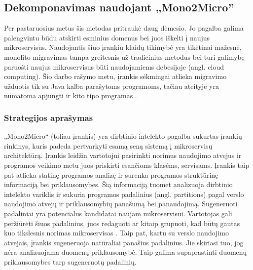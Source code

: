 \documentclass{VUMIFPSbakalaurinis}
\begin{document}

\subsection{Dekomponavimas naudojant „Mono2Micro”}
Per pastaruosius metus šis metodas pritraukė daug dėmesio. Jo pagalba galima palengvintu būdu atskirti esminius domenus bei juos iškelti į naujus mikroservisus. Naudojantis šiuo įrankiu klaidų tikimybė yra tikėtinai mažesnė, monolito migravimas tampa greitesnis už tradicinius metodus bei turi galimybę paruošti naujus mikroservisus būti naudojamiems debesijoje (angl. cloud computing). Šio darbo rašymo metu, įrankis sėkmingai atlieka migravimo užduotis tik su Java kalba parašytoms programoms, tačiau ateityje yra numatoma apjungti ir kito tipo programas \cite{KXL+20}.

\subsubsection{Strategijos aprašymas}
„Mono2Micro“ (toliau įrankis) yra dirbtinio intelekto pagalba sukurtas įrankių rinkinys, kuris padeda pertvarkyti esamą seną sistemą į mikroservisų architektūrą. Įrankis leidžia vartotojui pasirinkti norimus naudojimo atvejus ir programos veikimo metu juos priskirti esančioms klasėms, servisams. Įrankis taip pat atlieka statinę programos analizę ir surenka programos struktūrinę informaciją bei priklausomybes. Šią informaciją tuomet analizuoja dirbtinio intelekto variklis ir sukuria programos padalinius (angl. partitions) pagal verslo naudojimo atvejų ir priklausomybių panašumą bei panaudojimą. Sugeneruoti padaliniai yra potencialūs kandidatai naujam mikroservisui. Vartotojas gali peržiūrėti šiuos padalinius, juos redaguoti ar kitaip grupuoti, kad būtų gautas kuo tikslesnis norimas mikroservisas \cite{KXK+21}. Taip pat, kartu su verslo naudojimo atvejais, įrankis sugeneruoja natūraliai panašius padalinius. Jie skiriasi tuo, jog nėra analizuojama duomenų priklausomybė. Taip galima supaprastinti duomenų priklausomybes tarp sugeneruotų padalinių.
\end{document}

